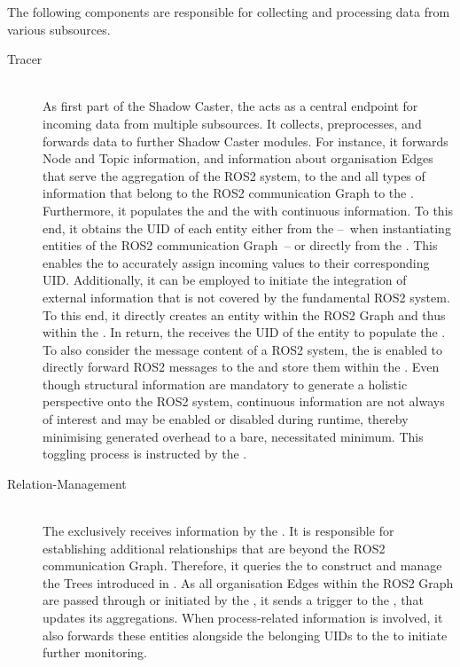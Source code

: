         The following components are responsible for collecting and processing data from various subsources.

\begin{description}
        \item[Tracer] \hfill \\
        As first part of the Shadow Caster, the  acts as a central endpoint for incoming data from multiple subsources. It collects, preprocesses, and forwards data to further Shadow Caster modules. For instance, it forwards Node and Topic information, and information about organisation Edges that serve the aggregation of the ROS2 system, to the  and all types of information that belong to the ROS2 communication Graph to the .
        Furthermore, it populates the  and the  with continuous information. 
        To this end, it obtains the UID of each entity either from the  --~when instantiating entities of the ROS2 communication Graph~-- or directly from the . This enables the  to accurately assign incoming values to their corresponding UID.\newline
        Additionally, it can be employed to initiate the integration of external information that is not covered by the fundamental ROS2 system. To this end, it directly creates an entity within the ROS2 Graph and thus within the . In return, the  receives the UID of the entity to populate the .\newline
        To also consider the message content of a ROS2 system, the  is enabled to directly forward ROS2 messages to the  and store them within the .\newline
        Even though structural information are mandatory to generate a holistic perspective onto the ROS2 system, continuous information are not always of interest and may be enabled or disabled during runtime, thereby minimising generated overhead to a bare, necessitated minimum. This toggling process is instructed by the .

        \item[Relation-Management] \hfill \\
        The  exclusively receives information by the . It is responsible for establishing additional relationships that are beyond the ROS2 communication Graph. Therefore, it queries the  to construct and manage the Trees introduced in . As all organisation Edges within the ROS2 Graph are passed through or initiated by the , it sends a trigger to the , that updates its aggregations. When process-related information is involved, it also forwards these entities alongside the belonging UIDs to the  to initiate further monitoring.


\end{description}
